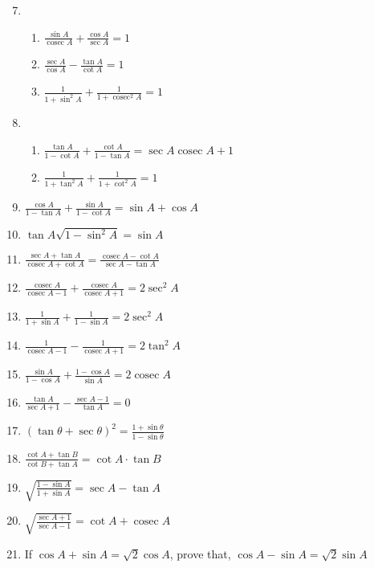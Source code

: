 \documentclass[12pt]{article}
\newcommand{\cosec}{\mathop{\mathrm{cosec}}}
\begin{document}
\begin{enumerate}
    \setcounter{enumi}{6}

    \item
    \begin{enumerate}
        \item $\frac{\sin A}{\cosec A} + \frac{\cos A}{\sec A} = 1$
        \item $\frac{\sec A}{\cos A} - \frac{\tan A}{\cot A} = 1$
        \item $\frac{1}{1 + \sin^2 A} + \frac{1}{1 + \cosec^2 A}= 1$
    \end{enumerate}
    
    \item
    \begin{enumerate}
        \item $\frac{\tan A}{1 - \cot A} + \frac{\cot A}{1 - \tan A} = \sec A \cosec A + 1$
        \item $\frac{1}{1 + \tan^2 A} + \frac{1}{1 + \cot^2 A} = 1$
    \end{enumerate}

    \item $\frac{\cos A}{1 - \tan A} + \frac{\sin A}{1 - \cot A} = \sin A + \cos A$

    \item $\tan A \sqrt{1 - \sin^2 A} = \sin A$
    
    \item $\frac{\sec A + \tan A}{\cosec A + \cot A} = \frac{\cosec A - \cot A}{\sec A - \tan A}$
    
    \item $\frac{\cosec A}{\cosec A - 1} + \frac{\cosec A}{\cosec A + 1} = 2\sec^2 A$
    
    \item $\frac{1}{1 + \sin A} + \frac{1}{1 - \sin A} = 2\sec^2 A$
    
    \item $\frac{1}{\cosec A - 1} - \frac{1}{\cosec A + 1} = 2\tan^2 A$
    
    \item $\frac{\sin A}{1 - \cos A} + \frac{1 - \cos A}{\sin A} = 2\cosec A$
    
    \item $\frac{\tan A}{\sec A + 1} - \frac{\sec A - 1}{\tan A} = 0$
    
    \item $(\tan\theta + \sec \theta)^2 = \frac{1 + \sin \theta}{1 - \sin \theta}$
    
    \item $\frac{\cot A + \tan B}{\cot B + \tan A} = \cot A \cdot \tan B$
    
    \item $\sqrt{\frac{1 - \sin A}{1 + \sin A}} = \sec A - \tan A$
    
    \item $\sqrt{\frac{\sec A + 1}{\sec A - 1}} = \cot A + \cosec A$
    
    \item If $\cos A + \sin A = \sqrt{2} \cos A$, prove that, $\cos A - \sin A = \sqrt{2} \sin A$
\end{enumerate}
\end{document}
